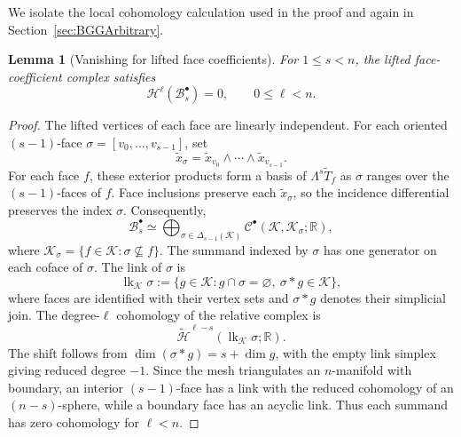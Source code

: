 \documentclass[10pt]{amsart}
\numberwithin{equation}{section}
\newtheorem{lemma}[theorem]{Lemma}
\begin{document}
We isolate the local cohomology calculation used in the proof and again in
Section~\ref{sec:BGGArbitrary}.
\begin{lemma}[Vanishing for lifted face coefficients]\label{lem:liftedFaceVanishing}
For $1\leq s<n$, the lifted face-coefficient complex satisfies
\[
\mathscr H^\ell(\mathcal B_s^\bullet)=0,\qquad 0\leq\ell<n.
\]
\end{lemma}
\begin{proof}
The lifted vertices of each face are linearly independent. For each
oriented $(s-1)$-face $\sigma=[v_0,\ldots,v_{s-1}]$, set
\[
\widetilde x_\sigma
=\widetilde x_{v_0}\wedge\cdots\wedge\widetilde x_{v_{s-1}}.
\]
For each face $f$, these exterior products form a basis of
$\Lambda^s\widetilde T_f$ as $\sigma$ ranges over the $(s-1)$-faces of $f$.
Face inclusions preserve each $\widetilde x_\sigma$, so the incidence
differential preserves the index $\sigma$. Consequently,
\[
\mathcal B_s^\bullet\simeq
\bigoplus_{\sigma\in\Delta_{s-1}(\mathcal K)}
\mathcal C^\bullet(\mathcal K,\mathcal K_\sigma;\mathbb R),
\]
where $\mathcal K_\sigma=\{f\in\mathcal K:\sigma\not\subseteq f\}$.
The summand indexed by $\sigma$ has one generator on each coface of $\sigma$.
The link of $\sigma$ is
\[
\operatorname{lk}_{\mathcal K}\sigma
:=\{g\in\mathcal K:g\cap\sigma=\varnothing,\ \sigma*g\in\mathcal K\},
\]
where faces are identified with their vertex sets and $\sigma*g$ denotes
their simplicial join. The degree-$\ell$ cohomology of the relative
complex is
\[
\widetilde{\mathscr H}^{\ell-s}(\operatorname{lk}_{\mathcal K}\sigma;\mathbb R).
\]
The shift follows from $\dim(\sigma*g)=s+\dim g$, with the empty link
simplex giving reduced degree $-1$. Since the mesh triangulates an
$n$-manifold with boundary, an interior $(s-1)$-face has a link with the
reduced cohomology of an $(n-s)$-sphere, while a boundary face has an
acyclic link. Thus each summand has zero cohomology for $\ell<n$.
\end{proof}
\end{document}
